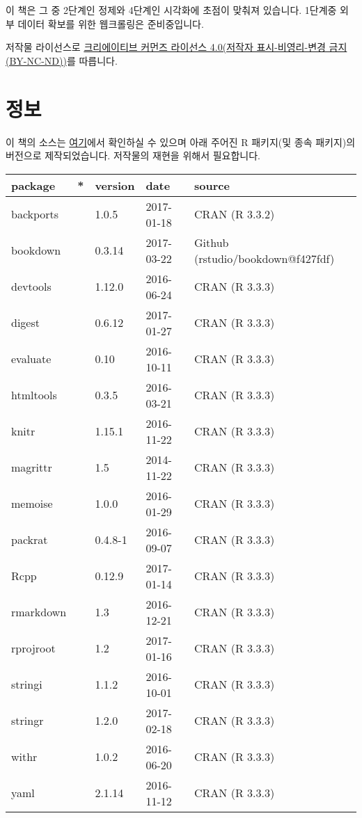 \documentclass[]{book}
\theoremstyle{definition}
\theoremstyle{definition}
\theoremstyle{remark}
\begin{document}
이 책은 그 중 2단계인 정제와 4단계인 시각화에 초점이 맞춰져 있습니다.
1단계중 외부 데이터 확보를 위한 웹크롤링은 준비중입니다.

저작물 라이선스로
\href{https://creativecommons.org/licenses/by-nc-nd/4.0/}{크리에이티브
커먼즈 라이선스 4.0(저작자 표시-비영리-변경 금지(BY-NC-ND))}를 따릅니다.

\chapter*{정보}

이 책의 소스는
\href{https://github.com/mrchypark/data_camp_dabrp}{여기}에서 확인하실
수 있으며 아래 주어진 R 패키지(및 종속 패키지)의 버전으로
제작되었습니다. 저작물의 재현을 위해서 필요합니다.

\begin{longtable}{lllll}
\toprule
package & * & version & date & source\\
\midrule
backports &  & 1.0.5 & 2017-01-18 & CRAN (R 3.3.2)\\
bookdown &  & 0.3.14 & 2017-03-22 & Github (rstudio/bookdown@f427fdf)\\
devtools &  & 1.12.0 & 2016-06-24 & CRAN (R 3.3.3)\\
digest &  & 0.6.12 & 2017-01-27 & CRAN (R 3.3.3)\\
evaluate &  & 0.10 & 2016-10-11 & CRAN (R 3.3.3)\\
\addlinespace
htmltools &  & 0.3.5 & 2016-03-21 & CRAN (R 3.3.3)\\
knitr &  & 1.15.1 & 2016-11-22 & CRAN (R 3.3.3)\\
magrittr &  & 1.5 & 2014-11-22 & CRAN (R 3.3.3)\\
memoise &  & 1.0.0 & 2016-01-29 & CRAN (R 3.3.3)\\
packrat &  & 0.4.8-1 & 2016-09-07 & CRAN (R 3.3.3)\\
\addlinespace
Rcpp &  & 0.12.9 & 2017-01-14 & CRAN (R 3.3.3)\\
rmarkdown &  & 1.3 & 2016-12-21 & CRAN (R 3.3.3)\\
rprojroot &  & 1.2 & 2017-01-16 & CRAN (R 3.3.3)\\
stringi &  & 1.1.2 & 2016-10-01 & CRAN (R 3.3.3)\\
stringr &  & 1.2.0 & 2017-02-18 & CRAN (R 3.3.3)\\
\addlinespace
withr &  & 1.0.2 & 2016-06-20 & CRAN (R 3.3.3)\\
yaml &  & 2.1.14 & 2016-11-12 & CRAN (R 3.3.3)\\
\bottomrule
\end{longtable}
\end{document}
